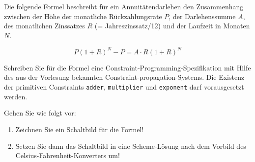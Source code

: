 
Die folgende Formel beschreibt für ein Annuitätendarlehen den 
Zusammenhang zwischen der Höhe der monatliche Rückzahlungsrate $P$, 
der Darlehenssumme $A$, des monatlichen Zinssatzes  $R$ (= Jahreszinssatz/12)
und der Laufzeit in Monaten $N$.

$$P(1+R)^{N}-P=A\cdot R(1+R)^{N}$$
 
Schreiben Sie für die Formel eine Constraint-Programming-Spezifikation mit 
Hilfe des aus der Vorlesung bekannten Constraint-propagation-Systems. 
Die Existenz der primitiven Constraints \texttt{adder}, 
\texttt{multiplier} und \texttt{exponent} darf vorausgesetzt werden.

Gehen Sie wie folgt vor:
\begin{enumerate}

    \item  Zeichnen Sie ein \glqq Schaltbild\grqq{} für die 
    Formel!

    \item  Setzen Sie dann das Schaltbild in eine Scheme-Lösung nach 
    dem Vorbild des Celsius-Fahrenheit-Konverters um!

\end{enumerate}
